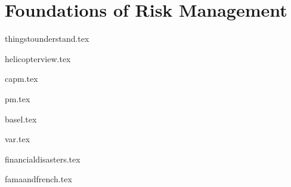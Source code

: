 \documentclass{report}
\begin{document}
	

\tableofcontents		

\part{Foundations of Risk Management}
\pagebreak

{thingstounderstand.tex}
\pagebreak

{helicopterview.tex}
\pagebreak

{capm.tex}
\pagebreak

{pm.tex}
\pagebreak

{basel.tex}
\pagebreak

{var.tex}
\pagebreak

{financialdisasters.tex}
\pagebreak

{famaandfrench.tex}
\pagebreak
\end{document}

